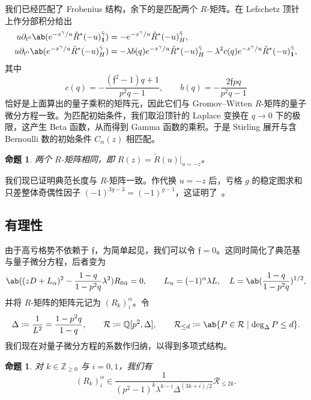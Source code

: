 \documentclass{amsart}
\newtheorem{prop}[thm]{命题}
\theoremstyle{definition}
\theoremstyle{remark}
\theoremstyle{plain}
\theoremstyle{definition}
\theoremstyle{remark}
\newcommand{\Z}{\mathbb{Z}}
\newcommand{\Q}{\mathbb{Q}}
\newcommand{\mc}[1]{\mathcal{#1}}
\newcommand{\mf}[1]{\mathfrak{#1}}
\newcommand{\1}{\mathbf{1}}
\newcommand{\2}{\mathbf{2}}
\newcommand{\3}{\mathbf{3}}
\begin{document}
我们已经匹配了 Frobenius 结构，余下的是匹配两个 \(R\)-矩阵。在 Lefschetz 顶针上作分部积分给出
\begin{align*}
    u \partial_{t^0}\ab(e^{-x^{\gamma}/u}\check{R}^*(-u)^{\bar{\gamma}}_{\1}) &= -e^{-x^{\gamma}/u}\check{R}^*(-u)^{\bar{\gamma}}_H, \\
    u\partial_{t^0}\ab(e^{-x^{\gamma}/u}\check{R}^*(-u)^{\bar{\gamma}}_H) &= -\lambda b(q)e^{-x^{\gamma}/u}\check{R}^*(-u)^{\bar{\gamma}}_H - \lambda^2 c(q) e^{-x^{\gamma}/u}\check{R}^*(-u)^{\bar{\gamma}}_{\1},
\end{align*}
其中
\[ c(q) = -\frac{(\mf{f}^2-1)q+1}{p^2q-1}, \qquad b(q) = -\frac{2\mf{f}pq}{p^2q-1} \]
恰好是上面算出的量子乘积的矩阵元，因此它们与 Gromov--Witten \(R\)-矩阵的量子微分方程一致。为匹配初始条件，我们取沿顶针的 Laplace 变换在 \(q \to 0\) 下的极限，这产生 Beta 函数，从而得到 Gamma 函数的乘积。于是 Stirling 展开与含 Bernoulli 数的初始条件 \(C_{\alpha}(z)\) 相匹配。

\begin{prop}%
\label{prop:R matrices coincide}
    两个 \(R\)-矩阵相同，即 \(R(z) = \check{R}(u)|_{u=-z}\)。
\end{prop}

我们现已证明典范长度与 \(R\)-矩阵一致。作代换 \(u = -z\) 后，亏格 \(g\) 的稳定图求和只差整体奇偶性因子 \((-1)^{3g-3} = (-1)^{g-1}\)，这证明了~。

\subsection{有理性}%
\label{sub:Rationality}

由于高亏格势不依赖于 \(\mf{f}\)，为简单起见，我们可以令 \(\mf{f} = 0\)。这同时简化了典范基与量子微分方程，后者变为
\[ \ab((zD+L_{\alpha})^2 - \frac{1-q}{1-p^2q}\lambda^2)R_{0\bar{\alpha}} = 0, \qquad L_{\alpha} = (-1)^{\alpha}\lambda L, \quad L = \ab(\frac{1-q}{1-p^2q})^{1/2}, \]
并将 \(R\)-矩阵的矩阵元记为 \((R_k)_i^{\alpha}\)。令
\[ \Delta \coloneqq \frac{1}{L^2} = \frac{1-p^2q}{1-q}, \qquad \mc{R} \coloneqq \Q[p^2,\Delta], \qquad \mc{R}_{\leq d} \coloneqq \ab\{P \in \mc{R} \mid \deg_{\Delta} P \leq d\}. \]
我们现在对量子微分方程的系数作归纳，以得到多项式结构。

\begin{prop}%
\label{prop:R matrix polynomiality}
    对 \(k \in \Z_{\geq0}\) 与 \(i = 0,1\)，我们有
    \[ (R_k)_i^{\alpha} \in \frac{1}{(p^2-1)^k \lambda^{k-i}\Delta^{(3k+i)/2}}\mc{R}_{\leq 2k}. \]
\end{prop}
\end{document}
